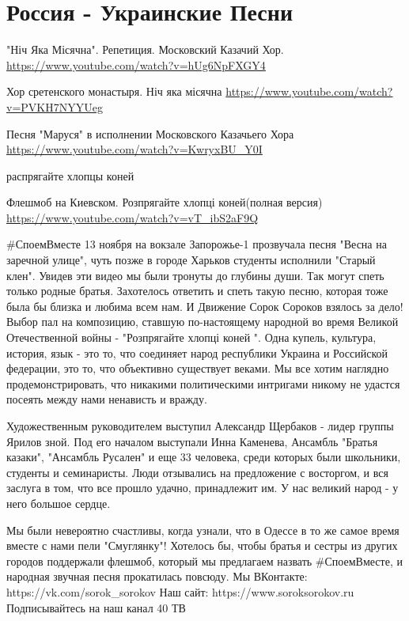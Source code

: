 
 
 
 
 
\section{Россия - Украинские Песни}

"Ніч Яка Місячна". Репетиция. Московский Казачий Хор.
\url{https://www.youtube.com/watch?v=hUg6NpFXGY4}

Хор сретенского монастыря. Ніч яка місячна
\url{https://www.youtube.com/watch?v=PVKH7NYYUeg}

Песня "Маруся" в исполнении Московского Казачьего Хора
\url{https://www.youtube.com/watch?v=KwryxBU_Y0I}

распрягайте хлопцы коней


Флешмоб на Киевском. Розпрягайте хлопці коней(полная версия)
\url{https://www.youtube.com/watch?v=vT_ibS2aF9Q}

#СпоемВместе
13 ноября на вокзале Запорожье-1 прозвучала песня "Весна на заречной улице", чуть позже в городе Харьков студенты исполнили "Старый клен". Увидев эти видео мы были тронуты до глубины души. Так могут спеть только родные братья. Захотелось ответить и спеть такую песню, которая тоже была бы близка и любима всем нам. И Движение Сорок Сороков взялось за дело! Выбор пал на композицию, ставшую по-настоящему народной во время Великой Отечественной войны - "Розпрягайте хлопці коней ".
Одна купель, культура, история, язык - это то, что соединяет народ республики Украина и Российской федерации, это то, что объективно существует веками. Мы все хотим наглядно продемонстрировать, что никакими политическими интригами никому не удастся посеять между нами ненависть и вражду.

Художественным руководителем выступил Александр Щербаков - лидер группы Ярилов зной. Под его началом выступали Инна Каменева, Ансамбль "Братья казаки", "Ансамбль Русален" и еще 33 человека, среди которых были школьники, студенты и семинаристы. Люди отзывались на предложение с восторгом, и вся заслуга в том, что все прошло удачно, принадлежит им. У нас великий народ - у него большое сердце.

Мы были невероятно счастливы, когда узнали, что в Одессе в то же самое время вместе с нами пели "Смуглянку"! 
Хотелось бы, чтобы братья и сестры из других городов поддержали флешмоб, который мы предлагаем назвать #СпоемВместе​, и народная звучная песня прокатилась повсюду.
Мы ВКонтакте: https://vk.com/sorok_sorokov
Наш сайт: https://www.soroksorokov.ru
Подписывайтесь на наш канал 40 ТВ


